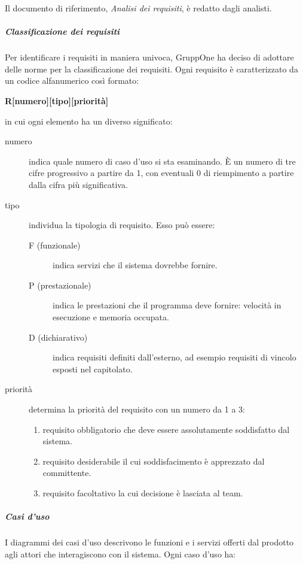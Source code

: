 \documentclass[../../norme-di-progetto.tex]{subfiles}
\begin{document}
Il documento di riferimento, \textit{Analisi dei requisiti}, è redatto dagli analisti.

\subparagraph{Classificazione dei requisiti}%
\label{subp:classificazione_dei_requisiti}

Per identificare i requisiti in maniera univoca, GruppOne ha deciso di adottare delle norme per la classificazione dei requisiti.
Ogni requisito è caratterizzato da un codice alfanumerico così formato:
\begin{center}
  \textbf{R[numero][tipo][priorità]}
\end{center}
in cui ogni elemento ha un diverso significato:
\begin{description}
  \item [numero] indica quale numero di caso d’uso si sta esaminando. È un numero di tre cifre progressivo a partire da 1, con eventuali 0 di riempimento a partire dalla cifra più significativa.
  \item [tipo] individua la tipologia di requisito. Esso può essere:
        \begin{description}
          \item [F (funzionale)] indica servizi che il sistema dovrebbe fornire.
          \item [P (prestazionale)] indica le prestazioni che il programma deve fornire: velocità in esecuzione e memoria occupata.
          \item [D (dichiarativo)] indica requisiti definiti dall'esterno, ad esempio requisiti di vincolo esposti nel capitolato.
        \end{description}
  \item [priorità] determina la priorità del requisito con un numero da 1 a 3:
        \begin{enumerate}
          \item requisito obbligatorio che deve essere assolutamente soddisfatto dal sistema.
          \item requisito desiderabile il cui soddisfacimento è apprezzato dal committente.
          \item requisito facoltativo la cui decisione è lasciata al team.
        \end{enumerate}
\end{description}

\subparagraph{Casi d'uso}%
\label{subp:casi_d'uso}
I diagrammi dei casi d'uso descrivono le funzioni e i servizi offerti dal prodotto agli attori che interagiscono con il sistema. Ogni caso d'uso ha:
\end{document}
